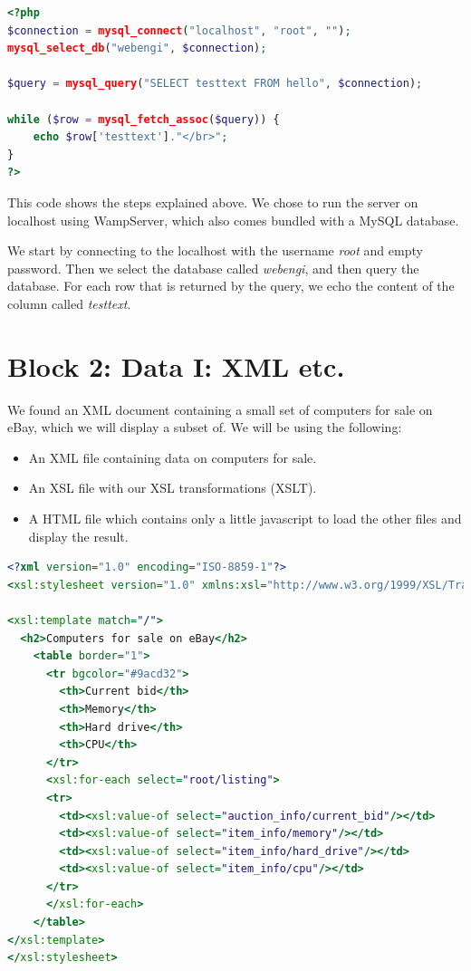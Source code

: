 \documentclass[a4paper,12pt]{article}
\begin{document}
\begin{lstlisting}[language=php,label=lst:aspectratio] 
<?php
$connection = mysql_connect("localhost", "root", "");
mysql_select_db("webengi", $connection);

$query = mysql_query("SELECT testtext FROM hello", $connection);

while ($row = mysql_fetch_assoc($query)) {
    echo $row['testtext']."</br>";
}
?>
\end{lstlisting}

This code shows the steps explained above. We chose to run the server on localhost using WampServer, which also comes bundled with a MySQL database.

We start by connecting to the localhost with the username \textit{root} and empty password. Then we select the database called \textit{webengi}, and then query the database. For each row that is returned by the query, we echo the content of the column called \textit{testtext}.

\section{Block 2: Data I: XML etc.}

We found an XML document containing a small set of computers for sale on eBay, which we will display a subset of. We will be using the following:
\begin{itemize}
\item An XML file containing data on computers for sale.
\item An XSL file with our XSL transformations (XSLT).
\item A HTML file which contains only a little javascript to load the other files and display the result.
\end{itemize}

\begin{lstlisting}[language=xslt,label=lst:xslt] 
<?xml version="1.0" encoding="ISO-8859-1"?>
<xsl:stylesheet version="1.0" xmlns:xsl="http://www.w3.org/1999/XSL/Transform">

<xsl:template match="/">
  <h2>Computers for sale on eBay</h2>
    <table border="1">
      <tr bgcolor="#9acd32">
        <th>Current bid</th>
        <th>Memory</th>
        <th>Hard drive</th>
        <th>CPU</th>
      </tr>
      <xsl:for-each select="root/listing">
      <tr>
        <td><xsl:value-of select="auction_info/current_bid"/></td>
        <td><xsl:value-of select="item_info/memory"/></td>
        <td><xsl:value-of select="item_info/hard_drive"/></td>
        <td><xsl:value-of select="item_info/cpu"/></td>
      </tr>
      </xsl:for-each>
    </table>
</xsl:template>
</xsl:stylesheet>
\end{lstlisting}
\end{document}
